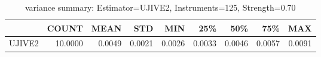 \begin{table}[ht]
\centering
\caption{variance summary: Estimator=UJIVE2, Instruments=125, Strength=0.70}
\begin{tabular}{lrrrrrrrr}
\toprule
 & COUNT & MEAN & STD & MIN & 25\% & 50\% & 75\% & MAX \\
\midrule
UJIVE2 & 10.0000 & 0.0049 & 0.0021 & 0.0026 & 0.0033 & 0.0046 & 0.0057 & 0.0091 \\
\bottomrule
\end{tabular}
\end{table}
